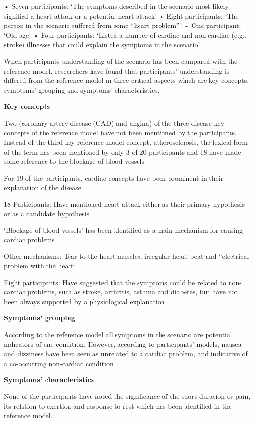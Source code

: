 \documentclass[]{article}
\begin{document}
•	Seven participants: ‘The symptoms described in the scenario most likely signified a heart attack or a potential heart attack’ 
•	Eight participants: ‘The person in the scenario suffered from some “heart problem”’
•	One participant: ‘Old age’
•	Four participants: ‘Listed a number of cardiac and non-cardiac (e.g., stroke) illnesses that could explain the symptoms in the scenario’ 

When participants understanding of the scenario has been compared with the reference model, researchers have found that participants’ understanding is differed from the reference model in three critical aspects which are key concepts, symptoms’ grouping and symptoms’ characteristics. 

\textbf{Key concepts}

Two (coronary artery disease (CAD) and angina) of the three disease key concepts of the reference model have not been mentioned by the participants. Instead of the third key reference model concept, atherosclerosis, the lexical form of the term has been mentioned by only 3 of 20 participants and 18 have made some reference to the blockage of blood vessels

For 19 of the participants, cardiac concepts have been prominent in their explanation of the disease

18 Participants: Have mentioned heart attack either as their primary hypothesis or as a candidate hypothesis
 
‘Blockage of blood vessels’ has been identified as a main mechanism for causing cardiac problems

Other mechanisms: Tear to the heart muscles, irregular heart beat and “electrical problem with the heart”

Eight participants: Have suggested that the symptoms could be related to non-cardiac problems, such as stroke, arthritis, asthma and diabetes, but have not been always supported by a physiological explanation  

\textbf{Symptoms’ grouping}

According to the reference model all symptoms in the scenario are potential indicators of one condition. However, according to participants’ models, nausea and dizziness have been seen as unrelated to a cardiac problem, and indicative of a co-occurring non-cardiac condition

\textbf{Symptoms’ characteristics} 

None of the participants have noted the significance of the short duration or pain, its relation to exertion and response to rest which has been identified in the reference model. 
\end{document}
